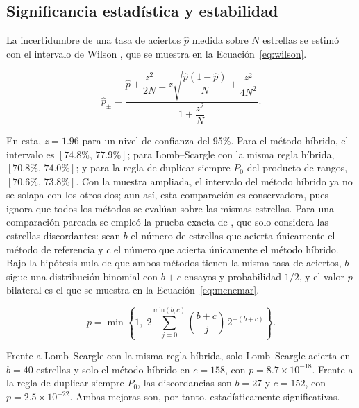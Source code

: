 \documentclass[12pt,letterpaper,oneside]{book}
\begin{document}
\subsection{Significancia estad\'istica y estabilidad}

La incertidumbre de una tasa de aciertos $\hat p$ medida sobre $N$ estrellas se estim\'o con el intervalo de Wilson \citep{Wilson1927}, que se muestra en la Ecuaci\'on~\eqref{eq:wilson}.

\begin{equation}
	\hat p_{\pm} = \frac{\hat p + \dfrac{z^2}{2N} \pm z\sqrt{\dfrac{\hat p(1-\hat p)}{N} + \dfrac{z^2}{4N^2}}}{1 + \dfrac{z^2}{N}}.
	\label{eq:wilson}
\end{equation}

En esta, $z=1.96$ para un nivel de confianza del 95\%. Para el m\'etodo h\'ibrido, el intervalo es $[74.8\%,\,77.9\%]$; para Lomb--Scargle con la misma regla h\'ibrida, $[70.8\%,\,74.0\%]$; y para la regla de duplicar siempre $P_0$ del producto de rangos, $[70.6\%,\,73.8\%]$. Con la muestra ampliada, el intervalo del m\'etodo h\'ibrido ya no se solapa con los otros dos; aun as\'i, esta comparaci\'on es conservadora, pues ignora que todos los m\'etodos se eval\'uan sobre las mismas estrellas. Para una comparaci\'on pareada se emple\'o la prueba exacta de \citet{McNemar1947}, que solo considera las estrellas discordantes: sean $b$ el n\'umero de estrellas que acierta \'unicamente el m\'etodo de referencia y $c$ el n\'umero que acierta \'unicamente el m\'etodo h\'ibrido. Bajo la hip\'otesis nula de que ambos m\'etodos tienen la misma tasa de aciertos, $b$ sigue una distribuci\'on binomial con $b+c$ ensayos y probabilidad $1/2$, y el valor $p$ bilateral es el que se muestra en la Ecuaci\'on~\eqref{eq:mcnemar}.

\begin{equation}
	p = \operatorname{min}\left\{1,\; 2\sum_{j=0}^{\mathrm{min}(b,c)} \binom{b+c}{j}\, 2^{-(b+c)}\right\}.
	\label{eq:mcnemar}
\end{equation}

Frente a Lomb--Scargle con la misma regla h\'ibrida, solo Lomb--Scargle acierta en $b=40$ estrellas y solo el m\'etodo h\'ibrido en $c=158$, con $p=8.7\times10^{-18}$. Frente a la regla de duplicar siempre $P_0$, las discordancias son $b=27$ y $c=152$, con $p=2.5\times10^{-22}$. Ambas mejoras son, por tanto, estad\'isticamente significativas.
\end{document}
